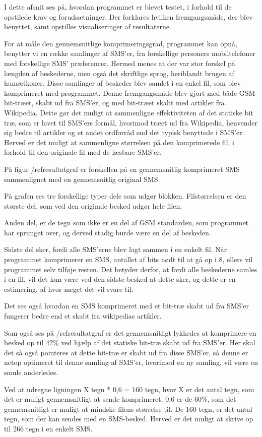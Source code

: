 I dette afsnit ses på, hvordan programmet er blevet testet, i forhold til de opstilede krav og 
forudsætninger. Der forklares hvilken fremgangsmåde, der blev benyttet, samt opstilles visualiseringer af 
resultaterne.

For at måle den gennemsnitlige komprimeringsgrad, programmet kan opnå, benytter vi en række samlinger 
af SMS’er, fra forskellige personers mobiltelefoner med forskellige SMS’ præferencer. Hermed menes at der 
var stor forskel på længden af beskederne, men også det skriftlige sprog, heriblandt brugen af 
humørikoner.
Disse samlinger af beskeder blev samlet i en enkel fil, som blev komprimeret med programmet.
Denne fremgangsmåde blev gjort med både GSM bit-træet, skabt ud fra SMS’er, og med bit-træet skabt med 
artikler fra Wikipedia. Dette gør det muligt at sammenligne effektiviteten af det statiske bit træ, som 
er lavet til SMS’ers formål, hvorimod træet ud fra Wikipedia, henvender sig bedre til artikler og et 
andet ordforråd end det typisk benyttede i SMS’er.
Herved er det muligt at sammenligne størrelsen på den komprimerede fil, i forhold til den originale fil 
med de læsbare SMS’er.

På figur /ref{resultatgraf} er forskellen på en gennemsnitlig komprimeret SMS sammenlignet med en 
gennemsnitlig original SMS.

På grafen ses tre forskellige typer dele som udgør blokken. Filstørrelsen er den største del, som ved den 
originale besked udgør hele filen.

Anden del, er de tegn som ikke er en del af GSM standarden, som programmet har sprunget over, og derved 
stadig burde være en del af beskeden.

Sidste del sker, fordi alle SMS’erne blev lagt sammen i en enkelt fil. Når programmet komprimerer en SMS, 
antallet af bits nødt til at gå op i 8, ellers vil programmet selv tilføje resten. Det betyder derfor, at 
fordi alle beskederne samles i en fil, vil det kun være ved den sidste besked at dette sker, og dette er 
en estimering, af hvor meget det vil svare til.

Det ses også hvordan en SMS komprimeret med et bit-træ skabt ud fra SMS’er fungerer bedre end et skabt 
fra wikipedias artikler.



Som også ses på /ref{resultatgraf} er det gennemsnitligt lykkedes at komprimere en besked op til 42\% ved 
hjælp af det statiske bit-træ skabt ud fra SMS’er.
Her skal det så også pointeres at dette bit-træ er skabt ud fra disse SMS’er, så denne er netop optimeret 
til denne samling af SMS’er, hvorimod en ny samling, vil være en smule anderledes.

Ved at udregne ligningen X tegn * 0,6 = 160 tegn, hvor X er det antal tegn, som det er muligt 
gennemsnitligt at sende komprimeret. 0,6 er de 60\%, som det gennemsnitligt er muligt at mindske filens 
størrelse til. De 160 tegn, er det antal tegn, som der kan sendes med en SMS-besked.
Herved er det muligt at skrive op til 266 tegn i en enkelt SMS.

